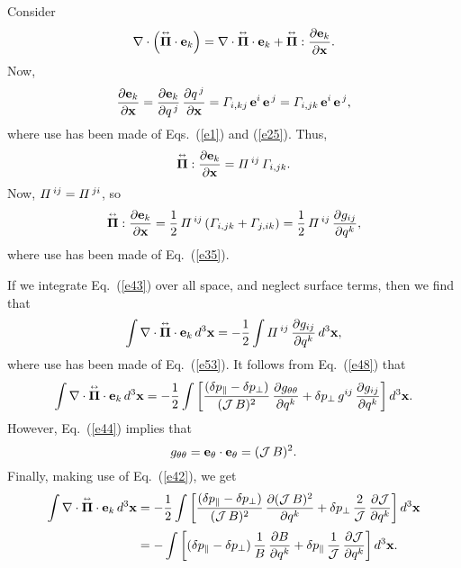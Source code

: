 \documentclass[12pt,prb,aps,notitlepage]{revtex4-1}
\newcommand{\bPi}{\mbox{\boldmath$\Pi$}}
\newcommand{\smalltensor}[1]{\overset{\text{\tiny$\leftrightarrow$}}{#1}}
\begin{document}
 Consider
 \begin{equation}\label{e43}
 \nabla\cdot\left(\smalltensor{\bPi}\cdot {\bf e}_k\right)= \nabla\cdot\smalltensor{\bPi}\cdot{\bf e}_k+ \smalltensor{\bPi}:\frac{\partial {\bf e}_k}{\partial{\bf x}}.
 \end{equation}
 Now,
  \begin{equation}
 \frac{\partial {\bf e}_k}{\partial{\bf x}}= \frac{\partial{\bf e}_k}{\partial q^{\,j}}\,\frac{\partial q^{\,j}}{\partial {\bf x}}= {\mit\Gamma}_{i,kj}\,{\bf e}^i\,{\bf e}^{\,j}
 = {\mit\Gamma}_{i,jk}\,{\bf e}^i\,{\bf e}^{\,j},
 \end{equation}
 where use has been made of Eqs.~(\ref{e1}) and (\ref{e25}). 
 Thus,
 \begin{equation}
 \smalltensor{\bPi}:\frac{\partial {\bf e}_k}{\partial{\bf x}}= {\mit\Pi}^{\,ij}\,{\mit\Gamma}_{i,jk}.
 \end{equation}
 Now,  ${\mit\Pi}^{\,ij}={\mit\Pi}^{\,ji}$, so  
 \begin{equation}\label{e53}
 \smalltensor{\bPi}:\frac{\partial {\bf e}_k}{\partial{\bf x}}= \frac{1}{2}\,{\mit\Pi}^{\,ij}\left({\mit\Gamma}_{i,jk}+{\mit\Gamma}_{j,ik}\right)= \frac{1}{2}\,{\mit\Pi}^{\,ij}\,\frac{\partial g_{ij}}{\partial q^k},
 \end{equation}
 where use has been made of Eq.~(\ref{e35}).
 
 If we integrate Eq.~(\ref{e43}) over all space, and neglect surface terms, then we find that
 \begin{equation}
 \int \nabla\cdot\smalltensor{\bPi}\cdot{\bf e}_k\,d^3{\bf x}= - \frac{1}{2}\int {\mit\Pi}^{\,ij}\,\frac{\partial g_{ij}}{\partial q^k}\,d^3{\bf x},
 \end{equation}
 where use has been made of Eq.~(\ref{e53}). It follows from Eq.~(\ref{e48}) that
 \begin{equation}
 \int \nabla\cdot\smalltensor{\bPi}\cdot{\bf e}_k\,d^3{\bf x}= - \frac{1}{2}\int \left[\frac{(\delta p_\parallel-\delta p_\perp)}{({\cal J}\,B)^2}\,\frac{\partial g_{\theta\theta}}{\partial q^k}+\delta p_\perp\,g^{ij}\,\frac{\partial g_{ij}}{\partial q^k}\right]d^3{\bf x}.
 \end{equation}
 However, Eq.~(\ref{e44}) implies that
 \begin{equation}
 g_{\theta\theta}= {\bf e}_\theta\cdot{\bf e}_\theta = ({\cal J}\,B)^2.
 \end{equation}
 Finally, making use of Eq.~(\ref{e42}), we get
 \begin{align}
 \int \nabla\cdot\smalltensor{\bPi}\cdot{\bf e}_k\,d^3{\bf x}&= - \frac{1}{2}\int \left[\frac{(\delta p_\parallel-\delta p_\perp)}{({\cal J}\,B)^2}\,\frac{\partial ({\cal J}\,B)^2}{\partial q^k}+\delta p_\perp\,\frac{2}{{\cal J}}\,\frac{\partial{\cal J}}{\partial q^k}\right]d^3{\bf x}\nonumber\\[0.5ex]
 &= -\int \left[(\delta p_\parallel-\delta p_\perp)\,\frac{1}{B}\,\frac{\partial B}{\partial q^k}+\delta p_\parallel\,\frac{1}{{\cal J}}\,\frac{\partial{\cal J}}{\partial q^k}\right]d^3{\bf x}.
 \end{align}
 
\end{document}
